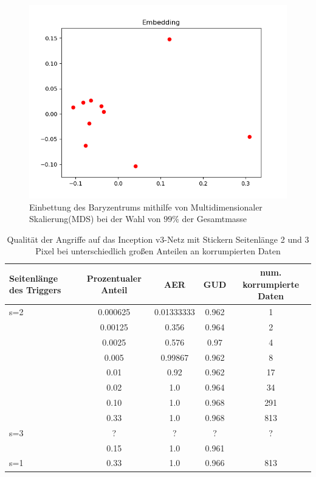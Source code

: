 \documentclass[twoside, 11pt,a4paper]{article}
\numberwithin{equation}{section}
\begin{document}
	\begin{figure}[h]
		\begin{center}
			\includegraphics[width=0.5\textheight]{bary_embedding99.png}
			\caption{Einbettung des Baryzentrums mithilfe von Multidimensionaler Skalierung(MDS) bei der Wahl von $99\%$ der Gesamtmasse}
		\end{center}
	\end{figure}
	
	
	
	
	\begin{table}[ht]
		
	
		\begin{center}
			\begin{tabular}{|l|c|c|c|c|}
				\hline
				Seitenlänge des Triggers& Prozentualer Anteil & AER & GUD & num. korrumpierte Daten \\ \hline
				s=2 & 0.000625 & 0.01333333  & 0.962  & 1 \\
				& 0.00125 & 0.356  & 0.964  & 2 \\
				& 0.0025 & 0.576 & 0.97 & 4 \\
				& 0.005 & 0.99867 & 0.962 & 8 \\
				& 0.01 & 0.92 & 0.962 & 17 \\
				& 0.02 & 1.0 & 0.964 & 34\\ 
				& 0.10 & 1.0 & 0.968 & 291\\ 
				& 0.33 & 1.0 & 0.968 & 813 \\ \hline
				s=3 & ? & ? & ? &? \\ 
				& 0.15 & 1.0 & 0.961& \\ \hline
				s=1 & 0.33 & 1.0 & 0.966 & 813 \\ \hline
			\end{tabular}
			\caption{Qualität der Angriffe auf das Inception v3-Netz mit Stickern Seitenlänge 2 und 3 Pixel bei unterschiedlich großen Anteilen an korrumpierten Daten}
			\label{tab:SPA_incv3}	
		\end{center}
	\end{table}
\end{document}
